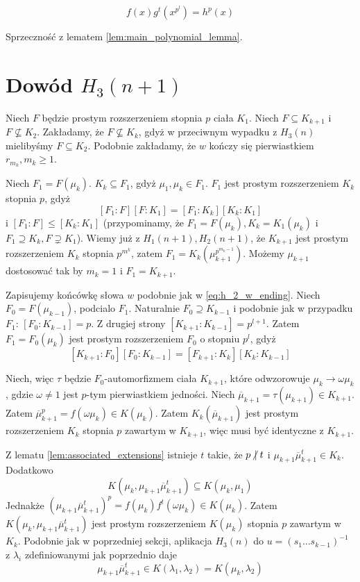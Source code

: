 \[f(x)g^t \left( x^{p^l} \right) = h^p(x)\]

Sprzeczność z lematem \ref{lem:main_polynomial_lemma}.

\section{Dowód $H_3(n+1)$}
Niech $F$ będzie prostym rozszerzeniem stopnia $p$ ciała $K_1$. Niech $F
\subseteq K_{k+1}$ i $F \not \subseteq K_2$. Zakładamy, że $F \not \subseteq
K_k$, gdyż w przeciwnym wypadku z $H_3(n)$ mielibyśmy $F \subseteq K_2$.
Podobnie zakładamy, że $w$ kończy się pierwiastkiem $r_{m_k}, m_k \geq 1$.

Niech $F_1 = F \left( \mu_k \right)$. $K_k \subseteq F_1$, gdyż $\mu_1, \mu_k
\in F_1$. $F_1$ jest prostym rozszerzeniem $K_k$ stopnia $p$, gdyż
\[
\left[F_1:F\right]\left[F:K_1 \right] =
\left[F_1:K_k\right]\left[K_k:K_1\right]
\]
i $\left[F_1:F\right] \leq \left[K_k:K_1\right]$ (przypominamy, że $F_1 =
F\left(\mu_k\right), K_k = K_1\left(\mu_k\right)$ i $F_1 \supseteq K_k, F
\supsetneq K_1$).
Wiemy już z $H_1(n+1), H_2(n+1)$, że $K_{k+1}$ jest prostym rozszerzeniem $K_k$
stopnia $p^{m^k}$, zatem $F_1 = K_k \left(\mu_{k+1}^{p^{m_k -1}} \right)$.
Możemy $\mu_{k+1}$ dostosować tak by $m_k = 1$ i $F_1 = K_{k+1}$.

Zapisujemy końcówkę słowa $w$ podobnie jak w \ref{eq:h_2_w_ending}. Niech $F_0 =
F \left( \mu_{k-1} \right)$, podcialo $F_1$. Naturalnie $F_0 \supseteq K_{k-1}$
i podobnie jak w przypadku $F_1$: $\left[F_0:K_{k-1} \right] = p$. Z drugiej
strony $\left[ K_{k+1} : K_{k-1} \right] = p^{l+1}$.  Zatem $F_1 = F_0
\left(\mu_k \right)$ jest prostym rozszerzeniem $F_0$ o stopniu $p^l$, gdyż
\[
  \left[K_{k+1} : F_0\right]\left[F_0:K_{k-1} \right] =
  \left[F_{k+1}:K_k\right]\left[K_k:K_{k-1}\right]
\]

Niech, więc $\tau$ będzie $F_0$-automorfizmem ciała $K_{k+1}$, które odwzorowuje
$\mu_k \rightarrow \omega \mu_k$, gdzie $\omega \neq 1$ jest $p$-tym
pierwiastkiem jedności. Niech $\overline{\mu}_{k+1} = \tau \left( \mu_{k+1}
\right) \in K_{k+1}$. Zatem $\overline{\mu}_{k+1}^p = f \left( \omega \mu_k
\right) \in K \left( \mu_k \right)$.
Zatem $K_k \left(\overline{\mu}_{k+1} \right)$ jest prostym rozszerzeniem $K_k$
stopnia $p$ zawartym w $K_{k+1}$, więc musi być identyczne z $K_{k+1}$.

Z lematu \ref{lem:associated_extensions} istnieje $t$ takie, że 
$p \! \not \!\, | \; t$ i
$\mu_{k+1} \overline{\mu}_{k+1}^t \in K_k$. Dodatkowo
\[ K \left( \mu_k, \mu_{k+1} \overline{\mu}_{k+1}^t \right)
  \subseteq
  K \left( \mu_k, \mu_1 \right)
\]
Jednakże $\left(\mu_{k+1}\overline{\mu}_{k+1}^t\right)^p =
f\left(\mu_k\right)f^t\left(\omega \mu_k\right) \in K\left(\mu_k\right)$. Zatem
$K \left( \mu_k, \mu_{k+1} \overline{\mu}_{k+1}^t \right)$
jest prostym rozszerzeniem $K\left(\mu_k\right)$ stopnia $p$ zawartym w
$K_k$. Podobnie jak w poprzedniej sekcji, aplikacja $H_3(n)$ do $u = \left(s_1
\ldots s_{k-1}\right)^{-1}$ z $\lambda_i$ zdefiniowanymi jak poprzednio daje
\[ \mu_{k+1}\overline{\mu}^t_{k+1} \in K\left(\lambda_1, \lambda_2\right) =
K\left(\mu_k, \lambda_2\right)\]

